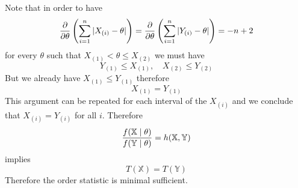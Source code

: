 %
%
%
Note that in order to have
$$
{\partial\over\partial\theta}
\left(\sum_{i=1}^n|X_{(i)}-\theta|\right)
=
{\partial\over\partial\theta}
\left(\sum_{i=1}^n|Y_{(i)}-\theta|\right)=-n+2
$$
for every $\theta$ such that $X_{(1)}<\theta\le X_{(2)}$ we must have
$$Y_{(1)}\le X_{(1)},\quad X_{(2)}\le Y_{(2)}$$
%
%
%
But we already have $X_{(1)}\le Y_{(1)}$ therefore
$$X_{(1)}=Y_{(1)}$$
This argument can be repeated for each interval of the $X_{(i)}$
and we conclude that $X_{(i)}=Y_{(i)}$ for all $i$.
Therefore
$${f(\mathbb X\mid\theta)\over f(\mathbb Y\mid\theta)}
=h(\mathbb X,\mathbb Y)$$
implies
$$T(\mathbb X)=T(\mathbb Y)$$
Therefore the order statistic is minimal sufficient.



